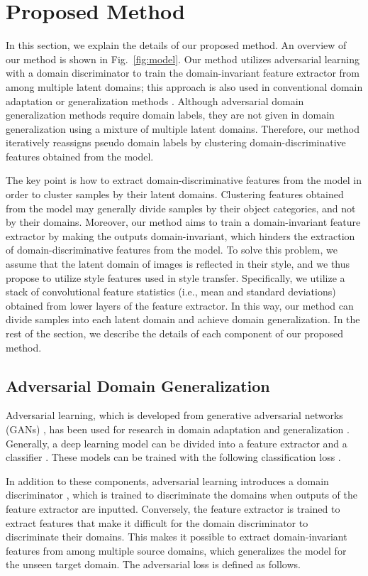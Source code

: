 \documentclass[letterpaper]{article} \usepackage{aaai20}  \usepackage{times}  \usepackage{helvet} \usepackage{courier}  \usepackage[hyphens]{url}  \usepackage{graphicx} \urlstyle{rm} \def\UrlFont{\rm}  \usepackage{graphicx}  \usepackage[whole]{bxcjkjatype}
\begin{document}
\section{Proposed Method}
In this section, we explain the details of our proposed method. An overview of our method is shown in Fig.~\ref{fig:model}. Our method utilizes adversarial learning with a domain discriminator to train the domain-invariant feature extractor from among multiple latent domains; this approach is also used in conventional domain adaptation or generalization methods \cite{GRL,CIDDG}. Although adversarial domain generalization methods require domain labels, they are not given in domain generalization using a mixture of multiple latent domains. Therefore, our method iteratively reassigns pseudo domain labels by clustering domain-discriminative features obtained from the model.\par
The key point is how to extract domain-discriminative features from the model in order to cluster samples by their latent domains. Clustering features obtained from the model may generally divide samples by their object categories, and not by their domains. Moreover, our method aims to train a domain-invariant feature extractor by making the outputs domain-invariant, which hinders the extraction of domain-discriminative features from the model. To solve this problem, we assume that the latent domain of images is reflected in their style, and we thus propose to utilize style features used in style transfer. Specifically, we utilize a stack of convolutional feature statistics (i.e., mean and standard deviations) obtained from lower layers of the feature extractor. In this way, our method can divide samples into each latent domain and achieve domain generalization. In the rest of the section, we describe the details of each component of our proposed method.
\subsection{Adversarial Domain Generalization}
Adversarial learning, which is developed from generative adversarial networks (GANs) \cite{GAN}, has been used for research in domain adaptation \cite{GRL} and generalization \cite{CIDDG}.
Generally, a deep learning model can be divided into a feature extractor  and a classifier . These models can be trained with the following classification loss .

\par
In addition to these components, adversarial learning introduces a domain discriminator , which is trained to discriminate the domains when outputs of the feature extractor are inputted.
Conversely, the feature extractor is trained to extract features that make it difficult for the domain discriminator to discriminate their domains.
This makes it possible to extract domain-invariant features from among multiple source domains, which generalizes the model for the unseen target domain.
The adversarial loss  is defined as follows.
\end{document}

